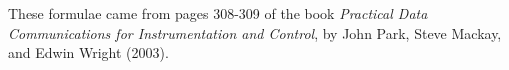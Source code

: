 \vskip 10pt

These formulae came from pages 308-309 of the book {\it Practical Data Communications for Instrumentation and Control}, by John Park, Steve Mackay, and Edwin Wright (2003).











